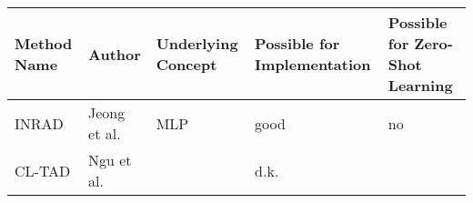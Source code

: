 \begin{longtable}[]{@{}lllll@{}}
\toprule\noalign{}
Method Name & Author & Underlying Concept & Possible for Implementation
& Possible for Zero-Shot Learning \\
\midrule\noalign{}
\endhead
\bottomrule\noalign{}
\endlastfoot
INRAD & Jeong et al. & MLP & good & no \\
CL-TAD & Ngu et al. & & d.k. & \\
\end{longtable}
